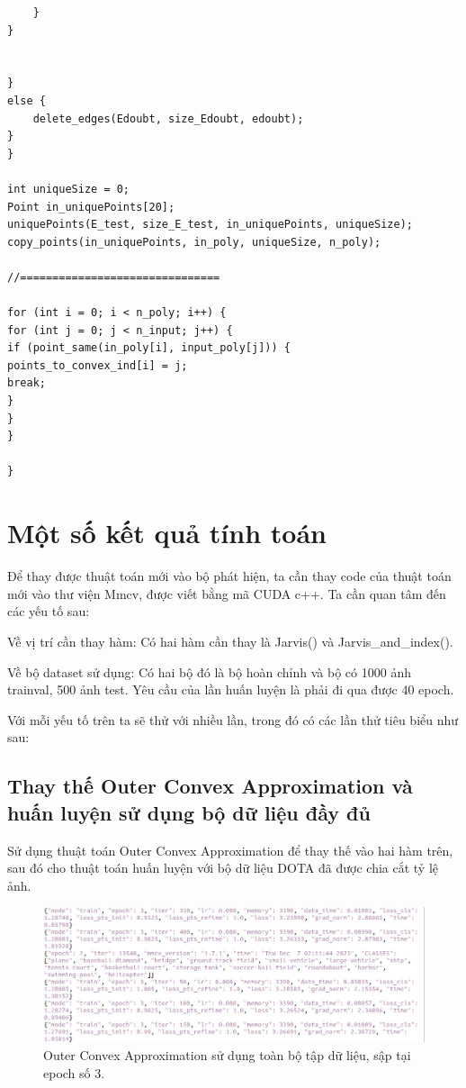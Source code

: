 \documentclass[12pt,a4paper,openany,oneside]{report}
\begin{document}
\begin{lstlisting}
	}
}


}
else {
	delete_edges(Edoubt, size_Edoubt, edoubt);
}
}

int uniqueSize = 0;
Point in_uniquePoints[20];
uniquePoints(E_test, size_E_test, in_uniquePoints, uniqueSize);
copy_points(in_uniquePoints, in_poly, uniqueSize, n_poly);

//===============================

for (int i = 0; i < n_poly; i++) {
for (int j = 0; j < n_input; j++) {
if (point_same(in_poly[i], input_poly[j])) {
points_to_convex_ind[i] = j;
break;
}
}
}                                          

}
\end{lstlisting}	
\chapter{Một số kết quả tính toán }

Để thay được thuật toán mới vào bộ phát hiện, ta cần thay code của thuật toán mới vào thư viện Mmcv, được viết bằng mã CUDA c++. Ta cần quan tâm đến các yếu tố sau:

Về vị trí cần thay hàm: Có hai hàm cần thay là Jarvis() và Jarvis\_and\_index().

Về bộ dataset sử dụng: Có hai bộ đó là bộ hoàn chỉnh và bộ có 1000 ảnh trainval, 500 ảnh test. Yêu cầu của lần huấn luyện là phải đi qua được 40 epoch.

Với mỗi yếu tố trên ta sẽ thử với nhiều lần, trong đó có các lần thử tiêu biểu như sau:

\section{Thay thế Outer Convex Approximation và huấn luyện sử dụng bộ dữ liệu đầy đủ}

Sử dụng thuật toán Outer Convex Approximation để thay thế vào hai hàm trên, sau đó cho thuật toán huấn luyện với bộ dữ liệu DOTA đã được chia cắt tỷ lệ ảnh.\\

\begin{figure}[ht!]
	\begin{center}
		\includegraphics[width=450px]{./outer_fulldata_epoch3.JPG}
		\caption{Outer Convex Approximation sử dụng toàn bộ tập dữ liệu, sập tại epoch số 3.}
		\label{outer_fulldata_epoch3}
	\end{center}
\end{figure} 
\end{document}
